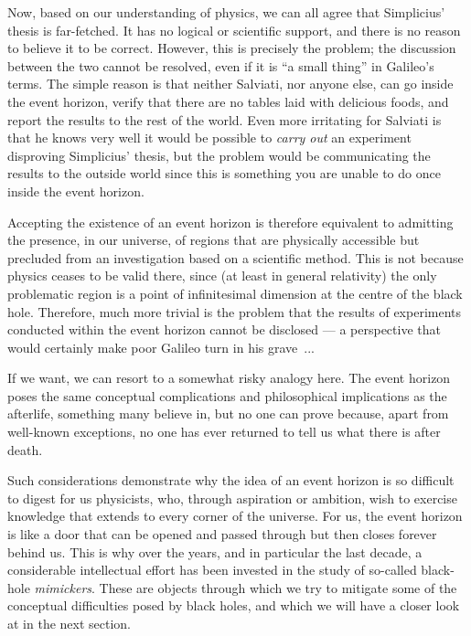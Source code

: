 Now, based on our understanding of physics, we can all agree that
Simplicius' thesis is far-fetched. It has no logical or scientific
support, and there is no reason to believe it to be correct. However, this is precisely
the problem; the discussion between the two cannot be resolved, even if it is ``a small
thing'' in Galileo's terms. The simple reason is that neither
Salviati, nor anyone else, can go inside the event horizon, verify
that there are no tables laid with delicious foods, and report the results to the rest
of the world. Even more irritating for Salviati is that he knows very well it would be
possible to \emph{carry out} an experiment disproving Simplicius' thesis, but the
problem would be communicating the results to the outside world since this is something
you are unable to do once inside the event horizon.

Accepting the existence of an event horizon is therefore equivalent to admitting the
presence, in our universe, of regions that are physically accessible but precluded from
an investigation based on a scientific method. This is not because
physics ceases to be valid there, since (at least in general relativity) the only
problematic region is a point of infinitesimal dimension at the centre of the black
hole. Therefore, much more trivial is the problem that the results of experiments
conducted within the event horizon cannot be disclosed --- a perspective that would
certainly make poor Galileo turn in his grave~...

If we want, we can resort to a somewhat risky analogy here. The event
horizon poses the same conceptual complications and philosophical
implications as the afterlife, something many believe in, but no one can prove because,
apart from well-known exceptions, no one has ever returned to tell us what there is
after death.

Such considerations demonstrate why the idea of an event horizon is so difficult to
digest for us physicists, who, through aspiration or ambition, wish to exercise
knowledge that extends to every corner of the universe. For us, the event horizon is
like a door that can be opened and passed through but then closes forever behind us.
This is why over the years, and in particular the last decade, a considerable
intellectual effort has been invested in the study of so-called black-hole
\emph{mimicker}\emph{s}. These are objects through which we try to
mitigate some of the conceptual difficulties posed by black holes, and which we will
have a closer look at in the next section.

